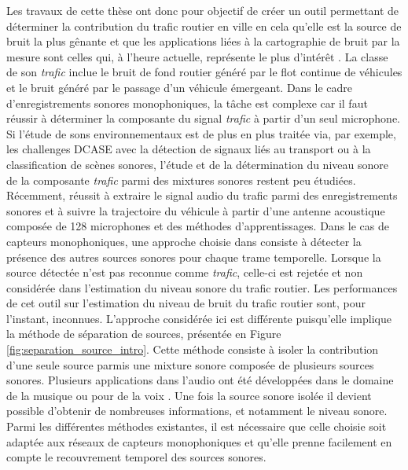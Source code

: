 Les travaux de cette thèse ont donc pour objectif de créer un outil permettant de déterminer la contribution du trafic routier en ville en cela qu'elle est la source de bruit la plus gênante et que les applications liées à la cartographie de bruit par la mesure sont celles qui, à l'heure actuelle, représente le plus d'intérêt \cite{jagniatinskis2014assessment}. La classe de son \textit{trafic} inclue le bruit de fond routier généré par le flot continue de véhicules et le bruit généré par le passage d'un véhicule émergeant.
Dans le cadre d'enregistrements sonores monophoniques, la tâche est complexe car il faut réussir à déterminer la composante du signal \textit{trafic} à partir d'un seul microphone. Si l'étude de sons environnementaux est de plus en plus traitée via, par exemple, les challenges DCASE \cite{stowell2015detection,mesaros2017dcase} avec la détection de signaux liés au transport ou à la classification de scènes sonores, l'étude et de la détermination du niveau sonore de la composante \textit{trafic} parmi des mixtures sonores restent peu étudiées. Récemment, \cite{leiba2017large} réussit à extraire le signal audio du trafic parmi des enregistrements sonores et à suivre la trajectoire du véhicule à partir d'une antenne acoustique composée de 128 microphones et des méthodes d'apprentissages.
Dans le cas de capteurs monophoniques, une approche choisie dans \cite{socoro2017anomalous} consiste à détecter la présence des autres sources sonores pour chaque trame temporelle. Lorsque la source détectée n'est pas reconnue comme \textit{trafic}, celle-ci est rejetée et non considérée dans l'estimation du niveau sonore du trafic routier. Les performances de cet outil sur l'estimation du niveau de bruit du trafic routier sont, pour l'instant, inconnues.
L'approche considérée ici est différente puisqu'elle implique la méthode de séparation de sources, présentée en Figure \ref{fig:separation_source_intro}. Cette méthode consiste à isoler la contribution d'une seule source parmis une mixture sonore composée de plusieurs sources sonores. Plusieurs applications dans l'audio ont été développées dans le domaine de la musique \cite{smaragdis_non-negative_2003,virtanen_monaural_2007} ou pour de la voix \cite{weninger2012supervised,yilmaz2004blind}. Une fois la source sonore isolée il devient possible d'obtenir de nombreuses informations, et notamment le niveau sonore. Parmi les différentes méthodes existantes, il est nécessaire que celle choisie soit adaptée aux réseaux de capteurs monophoniques et qu'elle prenne facilement en compte le recouvrement temporel des sources sonores. 

